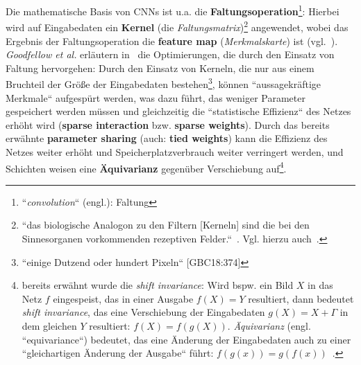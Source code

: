 Die mathematische Basis von CNNs ist u.a. die \textbf{Faltungsoperation}\footnote{
    ``\textit{convolution}`` (engl.): Faltung
}: Hierbei wird auf Eingabedaten ein \textbf{Kernel} (die \textit{Faltungsmatrix})\footnote{
    ``das biologische Analogon zu den Filtern [Kerneln] sind die bei den Sinnesorganen vorkommenden rezeptiven Felder.``~\cite[326]{Ert21b}. Vgl. hierzu auch~\cite[439]{LBH15}.
} angewendet, wobei das Ergebnis der Faltungsoperation die \textbf{feature map} (\textit{Merkmalskarte}) ist (vgl.~\cite[370]{GBC18}). \textit{Goodfellow et al.} erläutern in~\cite[374 ff.]{GBC18} die Optimierungen, die durch den Einsatz von Faltung hervorgehen: Durch den Einsatz von Kerneln, die nur aus einem Bruchteil der Größe der Eingabedaten bestehen\footnote{ ``einige Dutzend oder hundert Pixeln`` [GBC18:374]
}, können ``aussagekräftige Merkmale`` aufgespürt werden, was dazu führt, das weniger Parameter gespeichert werden müssen und gleichzeitig die ``statistische Effizienz`` des Netzes erhöht wird (\textbf{sparse interaction} bzw. \textbf{sparse weights}). Durch das bereits erwähnte \textbf{parameter sharing} (auch: \textbf{tied weights}) kann die Effizienz des Netzes weiter erhöht und Speicherplatzverbrauch weiter verringert werden, und Schichten weisen eine \textbf{Äquivarianz} gegenüber Verschiebung auf\footnote{ bereits erwähnt wurde die \textit{shift invariance}: Wird bspw. ein Bild $X$ in das Netz $f$ eingespeist, das in einer Ausgabe $f(X) = Y$ resultiert, dann bedeutet \textit{shift invariance}, das eine Verschiebung der Eingabedaten $g(X) = X+\Gamma$ in dem gleichen $Y$ resultiert: $f(X) = f(g(X))$.  \textit{Äquivarianz} (engl. ``equivariance``) bedeutet, das eine Änderung der Eingabedaten auch zu einer ``gleichartigen Änderung der Ausgabe`` führt: $f(g(x)) = g(f(x))$~\cite[377]{GBC18}.
}.



